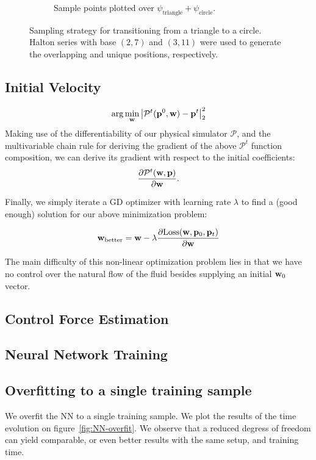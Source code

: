 \begin{figure}
\begin{subfigure}[t]{0.48\textwidth}
    \caption{Sample points plotted over $\psi_\text{triangle}
    + \psi_\text{circle}$.}
  \end{subfigure}\par\medskip
  \caption{Sampling strategy for transitioning from a triangle to a circle.
  Halton series with base $(2,7)$ and $(3,11)$ were used to generate the
  overlapping and unique positions, respectively.}
  \label{fig:sampling}
\end{figure}


\subsection{Initial Velocity}

$$
\arg\min_{\vb{w}} \left| \mathcal{P}^{t}(\vb{p}^0, \vb{w})
  - \vb{p}^t\right|_2^2
  $$
Making use of the differentiability of our physical simulator $\mathcal{P}$, and
the multivariable chain rule for deriving the gradient of the above
$\mathcal{P}^t$ function composition, we can derive its gradient with respect to
the initial coefficients: $$\frac{\partial
\mathcal{P}^t(\vb{w},\vb{p})}{\partial \vb{w}}.$$

Finally, we simply iterate a \ac{GD} optimizer with learning rate $\lambda$ to
find a (good enough) solution for our above minimization problem:

$$\vb{w}_{\text{better}} = \vb{w} - \lambda
\frac{
    \partial\text{Loss}(\vb{w}, \vb{p}_0, \vb{p}_t)
}{
    \partial \vb{w}
}$$

The main difficulty of this non-linear optimization problem lies in that we have
no control over the natural flow of the fluid besides supplying an initial
$\vb{w}_0$ vector.

\subsection{Control Force Estimation}

\subsection{Neural Network Training}

\subsection*{Overfitting to a single training sample}
We overfit the \ac{NN} to a single training sample. We plot the results of
the time evolution on figure~\ref{fig:NN-overfit}. We observe that a reduced
degress of freedom can yield comparable, or even better results with the same
setup, and training time. 

